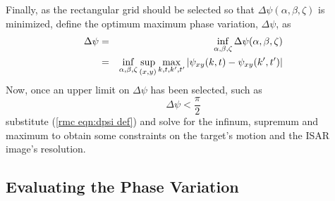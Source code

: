 Finally, as the rectangular grid should be selected so that 
$\Delta\psi(\alpha,\beta,\zeta)$ is minimized, define the optimum maximum
phase variation, $\Delta\psi$, as
\begin{eqnarray}
\Delta\psi&=&\inf_{\alpha,\beta,\zeta}\Delta\psi(\alpha,\beta,\zeta){\nonumber}\\
&=&\inf_{\alpha,\beta,\zeta}
\sup_{(x,y)}\max_{k,t,k',t'}\left|\psi_{xy}(k,t)-\psi_{xy}(k',t')\right|
\label{rmc eqn:dpsi def}
\end{eqnarray}
Now, once an upper limit on $\Delta\psi$ has been selected, such as
\begin{equation}\label{rmc eqn:dpsi cond II}
\Delta\psi<\frac{\pi}{2}
\end{equation}
substitute (\ref{rmc eqn:dpsi def}) and solve for the infinum, supremum and
maximum to obtain some constraints on the target's motion and the ISAR
image's resolution.


\subsection{Evaluating the Phase Variation}


